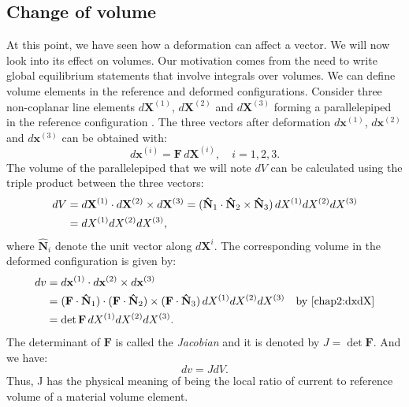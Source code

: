 	\subsection{Change of volume}
At this point, we have seen how a deformation can affect a vector. We will now look into its effect on volumes. Our motivation comes from the need to write global equilibrium statements that involve integrals over volumes. We can define volume elements in the reference and deformed configurations. Consider three non-coplanar line elements $d\mathbf{X}^{(1)}$, $d\mathbf{X}^{(2)}$ and $d\mathbf{X}^{(3)}$ forming a parallelepiped in the reference configuration . The three vectors after deformation $d\mathbf{x}^{(1)}$, $d\mathbf{x}^{(2)}$ and $d\mathbf{x}^{(3)}$ can be obtained with:
\begin{equation}
\label{chap2:dxdX}
d\mathbf{x}^{(i)} = \mathbf{F} \, d\mathbf{X}^{(i)}, \quad i = 1, 2, 3.
\end{equation}
The volume of the parallelepiped that we will note $dV$  can be calculated using the triple product between the three vectors:
\begin{align}
dV &= d\mathbf{X}^{(1)} \cdot d\mathbf{X}^{(2)} \times d\mathbf{X}^{(3)} = (\mathbf{\hat{N}}_{1} \cdot \mathbf{\hat{N}}_{2} \times \mathbf{\hat{N}}_{3}) \, dX^{(1)} dX^{(2)} dX^{(3)} \notag \\
&= dX^{(1)} dX^{(2)} dX^{(3)}, \label{chap2:dV}
\end{align}
where $\mathbf{\hat{N}}_{i}$ denote the unit vector along $d\mathbf{X}^{i}$. The corresponding volume in the deformed configuration is given by:
\begin{align}
dv &= d\mathbf{x}^{(1)} \cdot d\mathbf{x}^{(2)} \times d\mathbf{x}^{(3)} \notag \\
&=  (\mathbf{F} \cdot \mathbf{\hat{N}}_{1}) \cdot (\mathbf{F} \cdot \mathbf{\hat{N}}_{2}) \times (\mathbf{F} \cdot \mathbf{\hat{N}}_{3}) \,  dX^{(1)} dX^{(2)} dX^{(3)} \quad \text{by \eqref{chap2:dxdX}} \notag \\
&= \det \mathbf{F} \, dX^{(1)} dX^{(2)} dX^{(3)}. \label{chap2:dv}
\end{align}
The determinant of $\mathbf{F}$ is called the \emph{Jacobian} and it is denoted by $J = \det \mathbf{F}$. And we have:
\begin{equation}
\label{chap2:dvdV}
dv = J dV.
\end{equation}
Thus, J has the physical meaning of being the local ratio of current to reference volume of a material volume element.


